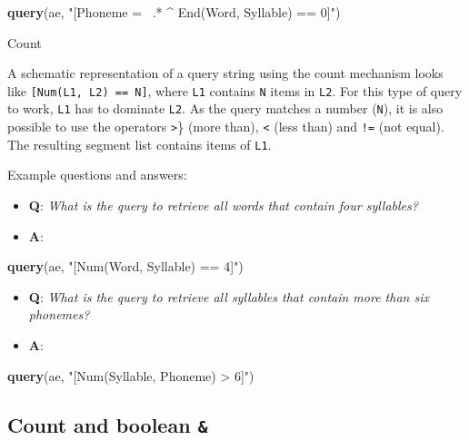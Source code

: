 \documentclass[]{book}
\newenvironment{Shaded}{\begin{snugshade}}{\end{snugshade}}
\newcommand{\KeywordTok}[1]{\textcolor[rgb]{0.13,0.29,0.53}{\textbf{#1}}}
\newcommand{\NormalTok}[1]{#1}
\newcommand{\StringTok}[1]{\textcolor[rgb]{0.31,0.60,0.02}{#1}}
\providecommand{\tightlist}{%
  \setlength{\itemsep}{0pt}\setlength{\parskip}{0pt}}
\begin{document}
\begin{Shaded}
\begin{Highlighting}[]
\KeywordTok{query}\NormalTok{(ae, }\StringTok{"[Phoneme =~ .* ^ End(Word, Syllable) == 0]"}\NormalTok{)}
\end{Highlighting}
\end{Shaded}

Count

A schematic representation of a query string using the count mechanism looks like \texttt{{[}Num(L1,\ L2)\ ==\ N{]}}, where \texttt{L1} contains \texttt{N} items in \texttt{L2}. For this type of query to work, \texttt{L1} has to dominate \texttt{L2}. As the query matches a number (\texttt{N}), it is also possible to use the operators \texttt{\textgreater{}}\} (more than), \texttt{\textless{}} (less than) and \texttt{!=} (not equal). The resulting segment list contains items of \texttt{L1}.

Example questions and answers:

\begin{itemize}
\tightlist
\item
  \textbf{Q}: \emph{What is the query to retrieve all words that contain four syllables?}
\item
  \textbf{A}:
\end{itemize}

\begin{Shaded}
\begin{Highlighting}[]
\KeywordTok{query}\NormalTok{(ae, }\StringTok{"[Num(Word, Syllable) == 4]"}\NormalTok{)}
\end{Highlighting}
\end{Shaded}

\begin{itemize}
\tightlist
\item
  \textbf{Q}: \emph{What is the query to retrieve all syllables that contain more than six phonemes?}
\item
  \textbf{A}:
\end{itemize}

\begin{Shaded}
\begin{Highlighting}[]
\KeywordTok{query}\NormalTok{(ae, }\StringTok{"[Num(Syllable, Phoneme) > 6]"}\NormalTok{)}
\end{Highlighting}
\end{Shaded}

\hypertarget{count-and-boolean}{%
\subsection{\texorpdfstring{Count and boolean \texttt{\&}}{Count and boolean \&}}\label{count-and-boolean}}
\end{document}
